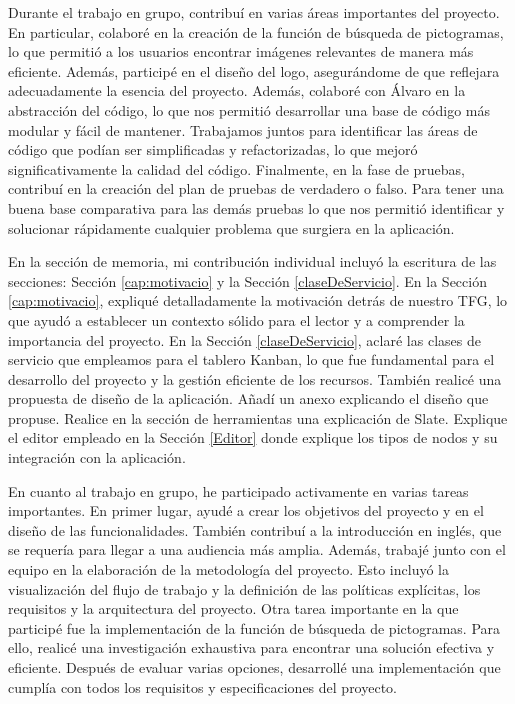 Durante el trabajo en grupo, contribuí en varias áreas importantes del proyecto. En particular, colaboré en la creación de la función de búsqueda de pictogramas, lo que permitió a los usuarios encontrar imágenes relevantes de manera más eficiente. Además, participé en el diseño del logo, asegurándome de que reflejara adecuadamente la esencia del proyecto. Además, colaboré con Álvaro en la abstracción del código, lo que nos permitió desarrollar una base de código más modular y fácil de mantener. Trabajamos juntos para identificar las áreas de código que podían ser simplificadas y refactorizadas, lo que mejoró significativamente la calidad del código. Finalmente, en la fase de pruebas, contribuí en la creación del plan de pruebas de verdadero o falso. Para tener una buena base comparativa para las demás pruebas lo que nos permitió identificar y solucionar rápidamente cualquier problema que surgiera en la aplicación.

En la sección de memoria, mi contribución individual incluyó la escritura de las secciones: Sección \ref{cap:motivacio} y la Sección \ref{claseDeServicio}. En la Sección \ref{cap:motivacio}, expliqué detalladamente la motivación detrás de nuestro TFG, lo que ayudó a establecer un contexto sólido para el lector y a comprender la importancia del proyecto. En la Sección \ref{claseDeServicio}, aclaré las clases de servicio que empleamos para el tablero Kanban, lo que fue fundamental para el desarrollo del proyecto y la gestión eficiente de los recursos. También realicé una propuesta de diseño de la aplicación. Añadí un anexo explicando el diseño que propuse. Realice en la sección de herramientas una explicación de Slate. Explique el editor empleado en la Sección \ref{Editor} donde explique los tipos de nodos y su integración con la aplicación.

En cuanto al trabajo en grupo, he participado activamente en varias tareas importantes. En primer lugar, ayudé a crear los objetivos del proyecto y en el diseño de las funcionalidades. También contribuí a la introducción en inglés, que se requería para llegar a una audiencia más amplia. Además, trabajé junto con el equipo en la elaboración de la metodología del proyecto. Esto incluyó la visualización del flujo de trabajo y la definición de las políticas explícitas, los requisitos y la arquitectura del proyecto. Otra tarea importante en la que participé fue la implementación de la función de búsqueda de pictogramas. Para ello, realicé una investigación exhaustiva para encontrar una solución efectiva y eficiente. Después de evaluar varias opciones, desarrollé una implementación que cumplía con todos los requisitos y especificaciones del proyecto.
